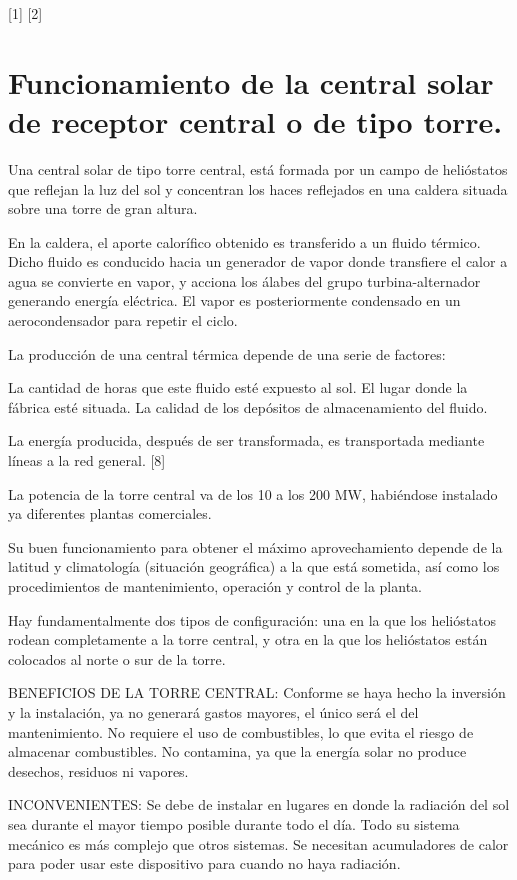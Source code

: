 \documentclass[12pt]{article}
\begin{document}
[1] [2]

\section{Funcionamiento de la central solar de receptor central o de tipo torre.}

Una central solar de tipo torre central, está formada por un campo de helióstatos que reflejan la luz del sol y concentran los haces reflejados en una caldera situada sobre una torre de gran altura.

En la caldera, el aporte calorífico obtenido es transferido a un fluido térmico. Dicho fluido es conducido hacia un generador de vapor donde transfiere el calor a agua se convierte en vapor, y acciona los álabes del grupo turbina-alternador generando energía eléctrica. El vapor es posteriormente condensado en un aerocondensador para repetir el ciclo.

La producción de una central térmica depende de una serie de factores:

La cantidad de horas que este fluido esté expuesto al sol.
El lugar donde la fábrica esté situada.
La calidad de los depósitos de almacenamiento del fluido.

La energía producida, después de ser transformada, es transportada mediante líneas a la red general. [8]

La potencia de la torre central va de los 10 a los 200 MW, habiéndose instalado ya diferentes plantas comerciales.

Su buen funcionamiento para obtener el máximo aprovechamiento depende de la latitud y climatología (situación geográfica) a la que está sometida, así como los procedimientos de mantenimiento, operación y control de la planta.

Hay fundamentalmente dos tipos de configuración: una en la que los helióstatos rodean completamente a la torre central, y otra en la que los helióstatos están colocados al norte o sur de la torre.

BENEFICIOS DE LA TORRE CENTRAL:
Conforme se haya hecho la inversión y la instalación, ya no generará gastos mayores, el único será el del mantenimiento.
No requiere el uso de combustibles, lo que evita el riesgo de almacenar combustibles.
No contamina, ya que la energía solar no produce desechos, residuos ni vapores.

INCONVENIENTES:
Se debe de instalar en lugares en donde la radiación del sol sea durante el mayor tiempo posible durante todo el día.
Todo su sistema mecánico es más complejo que otros sistemas.
Se necesitan acumuladores de calor para poder usar este dispositivo para cuando no haya radiación.
\end{document}
